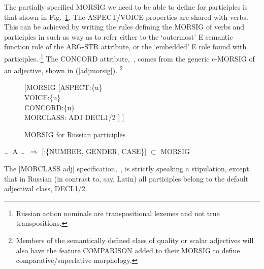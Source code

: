 \documentclass[output=paper,
modfonts
]{LSP/langsci}
\begin{document}
The partially specified MORSIG we need to be able to define for participles is that shown in Fig.~\ref{fig:ptcpMORSIG}. The ASPECT/VOICE properties are shared with verbs. This can be achieved by writing the rules defining the MORSIG of verbs and participles in such as way as to refer either to the ‘outermost’ E semantic function role of the ARG-STR attribute, or the ‘embedded’ E role found with participles.%
\footnote{Russian action nominals are transpositional lexemes and not true transpositions.} %
The CONCORD attribute,  \,,  comes from the generic c-MORSIG of an adjective, shown in (\ref{adjmorsig}).%
\footnote{Members of the semantically defined class of quality or scalar adjectives will also have the feature COMPARISON added to their MORSIG to define comparative/superlative morphology.} %


\begin{figure}
	\begin{center}
\begin{avm}

[MORSIG 	[ASPECT:\{u\}	\\
		VOICE:\{u\}\\
		CONCORD:\{u\}\\  
		MORCLASS: ADJ|DECL1/2
		]
]

\end{avm}\bigskip

\caption{MORSIG for Russian participles}	\label{fig:ptcpMORSIG}
	\end{center}
\end{figure}

\begin{exe}	\ex	\label{adjmorsig}

\ldots\ A \ldots\  $\Rightarrow$  [:\{NUMBER, GENDER, CASE\}] $\subset$ MORSIG
\end{exe}

The [MORCLASS adj] specification, \,, is strictly speaking a stipulation, except that in Russian (in contrast to, say, Latin) all participles belong to the default adjectival class, DECL1/2. %
\end{document}
